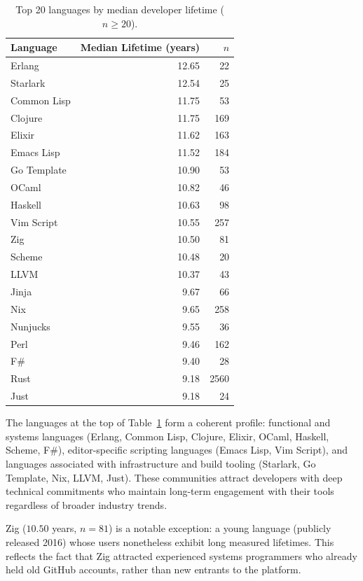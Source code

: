\documentclass[12pt,a4paper]{article}
\begin{document}
\begin{table}[h]
\centering
\begin{tabular}{lrr}
\toprule
Language & Median Lifetime (years) & $n$ \\
\midrule
Erlang       & 12.65 &   22 \\
Starlark     & 12.54 &   25 \\
Common Lisp  & 11.75 &   53 \\
Clojure      & 11.75 &  169 \\
Elixir       & 11.62 &  163 \\
Emacs Lisp   & 11.52 &  184 \\
Go Template  & 10.90 &   53 \\
OCaml        & 10.82 &   46 \\
Haskell      & 10.63 &   98 \\
Vim Script   & 10.55 &  257 \\
Zig          & 10.50 &   81 \\
Scheme       & 10.48 &   20 \\
LLVM         & 10.37 &   43 \\
Jinja        &  9.67 &   66 \\
Nix          &  9.65 &  258 \\
Nunjucks     &  9.55 &   36 \\
Perl         &  9.46 &  162 \\
F\#          &  9.40 &   28 \\
Rust         &  9.18 & 2560 \\
Just         &  9.18 &   24 \\
\bottomrule
\end{tabular}
\caption{Top 20 languages by median developer lifetime ($n \geq 20$).}
\label{tab:lifetime}
\end{table}

The languages at the top of Table~\ref{tab:lifetime} form a coherent profile:
functional and systems languages (Erlang, Common Lisp, Clojure, Elixir, OCaml,
Haskell, Scheme, F\#), editor-specific scripting languages (Emacs Lisp, Vim
Script), and languages associated with infrastructure and build tooling
(Starlark, Go Template, Nix, LLVM, Just). These communities attract developers
with deep technical commitments who maintain long-term engagement with their
tools regardless of broader industry trends.

Zig ($10.50$ years, $n=81$) is a notable exception: a young language (publicly
released 2016) whose users nonetheless exhibit long measured lifetimes. This
reflects the fact that Zig attracted experienced systems programmers who already
held old GitHub accounts, rather than new entrants to the platform.
\end{document}
